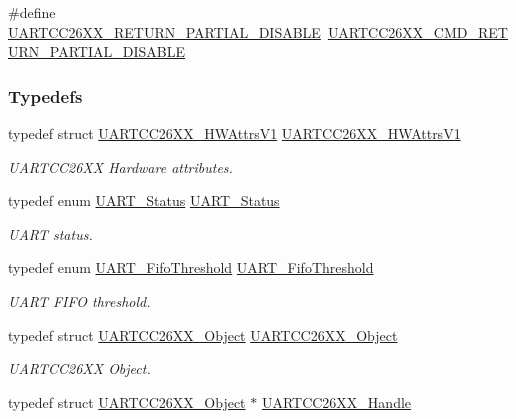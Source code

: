 \begin{DoxyCompactItemize}
\item 
\#define \hyperlink{_u_a_r_t_c_c26_x_x_8h_a973b0815d1f88dc3f3e7191625783b99}{U\+A\+R\+T\+C\+C26\+X\+X\+\_\+\+R\+E\+T\+U\+R\+N\+\_\+\+P\+A\+R\+T\+I\+A\+L\+\_\+\+D\+I\+S\+A\+B\+L\+E}~\hyperlink{group___u_a_r_t___c_m_d_ga7cc7c1551022a60bd310c79acb6b26b8}{U\+A\+R\+T\+C\+C26\+X\+X\+\_\+\+C\+M\+D\+\_\+\+R\+E\+T\+U\+R\+N\+\_\+\+P\+A\+R\+T\+I\+A\+L\+\_\+\+D\+I\+S\+A\+B\+L\+E}
\end{DoxyCompactItemize}
\subsubsection*{Typedefs}
\begin{DoxyCompactItemize}
\item 
typedef struct \hyperlink{struct_u_a_r_t_c_c26_x_x___h_w_attrs_v1}{U\+A\+R\+T\+C\+C26\+X\+X\+\_\+\+H\+W\+Attrs\+V1} \hyperlink{_u_a_r_t_c_c26_x_x_8h_a17c84d23401f09a0060deecf660018eb}{U\+A\+R\+T\+C\+C26\+X\+X\+\_\+\+H\+W\+Attrs\+V1}
\begin{DoxyCompactList}\small\item\em U\+A\+R\+T\+C\+C26\+X\+X Hardware attributes. \end{DoxyCompactList}\item 
typedef enum \hyperlink{_u_a_r_t_c_c26_x_x_8h_a778bbef5f4b52a5651552136715f53c4}{U\+A\+R\+T\+\_\+\+Status} \hyperlink{_u_a_r_t_c_c26_x_x_8h_a27818b82da9cf35d1f0f228b1f69b036}{U\+A\+R\+T\+\_\+\+Status}
\begin{DoxyCompactList}\small\item\em U\+A\+R\+T status. \end{DoxyCompactList}\item 
typedef enum \hyperlink{_u_a_r_t_c_c26_x_x_8h_a292a5e751577698b215f5e8aa1c79e99}{U\+A\+R\+T\+\_\+\+Fifo\+Threshold} \hyperlink{_u_a_r_t_c_c26_x_x_8h_a9169576296a1811855ec75dce0f8e316}{U\+A\+R\+T\+\_\+\+Fifo\+Threshold}
\begin{DoxyCompactList}\small\item\em U\+A\+R\+T F\+I\+F\+O threshold. \end{DoxyCompactList}\item 
typedef struct \hyperlink{struct_u_a_r_t_c_c26_x_x___object}{U\+A\+R\+T\+C\+C26\+X\+X\+\_\+\+Object} \hyperlink{_u_a_r_t_c_c26_x_x_8h_a41437180bc6a286da889dc2aae1c001c}{U\+A\+R\+T\+C\+C26\+X\+X\+\_\+\+Object}
\begin{DoxyCompactList}\small\item\em U\+A\+R\+T\+C\+C26\+X\+X Object. \end{DoxyCompactList}\item 
typedef struct \hyperlink{struct_u_a_r_t_c_c26_x_x___object}{U\+A\+R\+T\+C\+C26\+X\+X\+\_\+\+Object} $\ast$ \hyperlink{_u_a_r_t_c_c26_x_x_8h_a276d493f1689ad8c16b5cfb4dada194a}{U\+A\+R\+T\+C\+C26\+X\+X\+\_\+\+Handle}
\end{DoxyCompactItemize}
